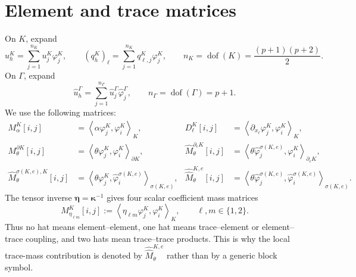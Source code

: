 \documentclass[11pt]{article}
\newcommand{\dof}{\operatorname{dof}}
\newcommand{\Mhat}{\widehat M}
\newcommand{\Mhh}{\widehat{\widehat M}}
\newcommand{\kappab}{\boldsymbol\kappa}
\newcommand{\etab}{\boldsymbol\eta}
\newcommand{\inner}[2]{\left\langle #1,#2\right\rangle}
\begin{document}
\section{Element and trace matrices}

On $K$, expand
\[
    u_h^K=\sum_{j=1}^{n_K}u_j^K\varphi_j^K,
    \qquad
    (q_h^K)_\ell=\sum_{j=1}^{n_K}q_{\ell,j}^K\varphi_j^K,
    \qquad
    n_K=\dof(K)=\frac{(p+1)(p+2)}2.
\]
On $\Gamma$, expand
\[
    \widehat u_h^\Gamma=\sum_{j=1}^{n_\Gamma}\widehat u_j^\Gamma\widehat\varphi_j^\Gamma,
    \qquad n_\Gamma=\dof(\Gamma)=p+1.
\]
We use the following matrices:
\begin{align*}
    M_\alpha^K[i,j]
        &=\inner{\alpha\varphi_j^K}{\varphi_i^K}_{K}, &
    D_\ell^K[i,j]
        &=\inner{\partial_{x_\ell}\varphi_j^K}{\varphi_i^K}_{K},\\
    M_\theta^{\partial K}[i,j]
        &=\inner{\theta\varphi_j^K}{\varphi_i^K}_{\partial K}, &
    \Mhat_\theta^{\partial_eK}[i,j]
        &=\inner{\theta\widehat\varphi_j^{\sigma(K,e)}}{\varphi_i^K}_{\partial_eK},\\
    \Mhat_\theta^{\sigma(K,e),K}[i,j]
        &=\inner{\theta\varphi_j^K}{\widehat\varphi_i^{\sigma(K,e)}}_{\sigma(K,e)}, &
    \Mhh_\theta^{K,e}[i,j]
        &=\inner{\theta\widehat\varphi_j^{\sigma(K,e)}}{\widehat\varphi_i^{\sigma(K,e)}}_{\sigma(K,e)}.
\end{align*}
The tensor inverse $\etab=\kappab^{-1}$ gives four scalar coefficient mass matrices
\[
    M_{\eta_{\ell m}}^K[i,j]
    :=
    \inner{\eta_{\ell m}\varphi_j^K}{\varphi_i^K}_{K},
    \qquad
    \ell,m\in\{1,2\}.
\]
Thus no hat means element--element, one hat means trace--element or element--trace coupling, and two hats mean trace--trace products. This is why the local trace-mass contribution is denoted by $\Mhh_\theta^{K,e}$ rather than by a generic block symbol.
\end{document}
